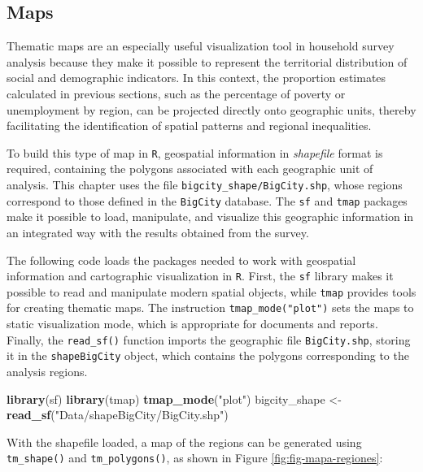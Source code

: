 \documentclass[
  english,
  12pt,
]{book}
\newenvironment{Shaded}{\begin{snugshade}}{\end{snugshade}}
\newcommand{\FunctionTok}[1]{\textcolor[rgb]{0.13,0.29,0.53}{\textbf{#1}}}
\newcommand{\NormalTok}[1]{#1}
\newcommand{\OtherTok}[1]{\textcolor[rgb]{0.56,0.35,0.01}{#1}}
\newcommand{\StringTok}[1]{\textcolor[rgb]{0.31,0.60,0.02}{#1}}
\begin{document}
\subsection{Maps}\label{viz-mapas}

Thematic maps are an especially useful visualization tool in household survey analysis because they make it possible to represent the territorial distribution of social and demographic indicators. In this context, the proportion estimates calculated in previous sections, such as the percentage of poverty or unemployment by region, can be projected directly onto geographic units, thereby facilitating the identification of spatial patterns and regional inequalities.

To build this type of map in \texttt{R}, geospatial information in \emph{shapefile} format is required, containing the polygons associated with each geographic unit of analysis. This chapter uses the file \texttt{bigcity\_shape/BigCity.shp}, whose regions correspond to those defined in the \texttt{BigCity} database. The \texttt{sf} \citep{sf2026} and \texttt{tmap} \citep{tmap2026} packages make it possible to load, manipulate, and visualize this geographic information in an integrated way with the results obtained from the survey.

The following code loads the packages needed to work with geospatial information and cartographic visualization in \texttt{R}. First, the \texttt{sf} library makes it possible to read and manipulate modern spatial objects, while \texttt{tmap} provides tools for creating thematic maps. The instruction \texttt{tmap\_mode("plot")} sets the maps to static visualization mode, which is appropriate for documents and reports. Finally, the \texttt{read\_sf()} function imports the geographic file \texttt{BigCity.shp}, storing it in the \texttt{shapeBigCity} object, which contains the polygons corresponding to the analysis regions.

\begin{Shaded}
\begin{Highlighting}[]
\FunctionTok{library}\NormalTok{(sf)}
\FunctionTok{library}\NormalTok{(tmap)}
\FunctionTok{tmap\_mode}\NormalTok{(}\StringTok{"plot"}\NormalTok{)}
\NormalTok{bigcity\_shape }\OtherTok{\textless{}{-}} \FunctionTok{read\_sf}\NormalTok{(}\StringTok{"Data/shapeBigCity/BigCity.shp"}\NormalTok{)}
\end{Highlighting}
\end{Shaded}

With the shapefile loaded, a map of the regions can be generated using \texttt{tm\_shape()} and \texttt{tm\_polygons()}, as shown in Figure \ref{fig:fig-mapa-regiones}:
\end{document}

